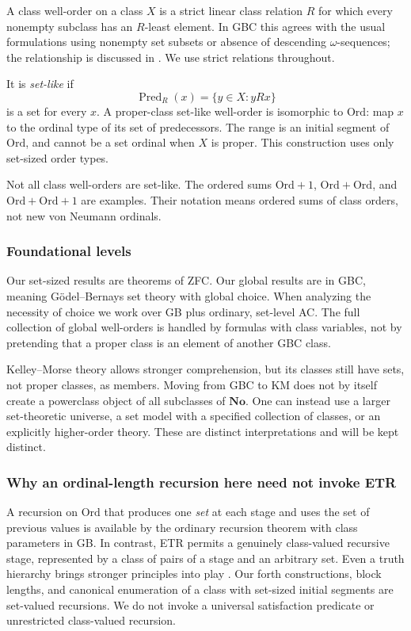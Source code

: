 \documentclass[11pt]{article}
\theoremstyle{definition}
\theoremstyle{remark}
\newcommand{\No}{\mathbf{No}}
\newcommand{\Ord}{\mathrm{Ord}}
\newcommand{\pred}{\operatorname{Pred}}
\begin{document}
A class well-order on a class $X$ is a strict linear class relation $R$
for which every nonempty subclass has an $R$-least element. In GBC this
agrees with the usual formulations using nonempty set subsets or absence
of descending $\omega$-sequences; the relationship is discussed in
\cite[\S3]{HamkinsWoodin}. We use strict relations throughout.

It is \emph{set-like} if
\[
 \pred_R(x)=\{y\in X:yRx\}
\]
is a set for every $x$. A proper-class set-like well-order is isomorphic
to $\Ord$: map $x$ to the ordinal type of its set of predecessors. The
range is an initial segment of $\Ord$, and cannot be a set ordinal when
$X$ is proper. This construction uses only set-sized order types.

Not all class well-orders are set-like. The ordered sums
$\Ord+1$, $\Ord+\Ord$, and $\Ord+\Ord+1$ are examples. Their notation
means ordered sums of class orders, not new von Neumann ordinals.

\subsubsection{Foundational levels}

Our set-sized results are theorems of ZFC. Our global results are in GBC,
meaning Gödel--Bernays set theory with global choice. When analyzing the
necessity of choice we work over GB plus ordinary, set-level AC.
The full collection of global well-orders is handled by formulas with
class variables, not by pretending that a proper class is an element of
another GBC class.

Kelley--Morse theory allows stronger comprehension, but its classes still
have sets, not proper classes, as members. Moving from GBC to KM does not
by itself create a powerclass object of all subclasses of $\No$.
One can instead use a larger set-theoretic universe, a set model with a
specified collection of classes, or an explicitly higher-order theory.
These are distinct interpretations and will be kept distinct.

\subsubsection{Why an ordinal-length recursion here need not invoke ETR}

A recursion on $\Ord$ that produces one \emph{set} at each stage and uses
the set of previous values is available by the ordinary recursion theorem
with class parameters in GB. In contrast, ETR permits a genuinely
class-valued recursive stage, represented by a class of pairs of a stage
and an arbitrary set. Even a truth hierarchy brings stronger principles
into play \cite[\S2]{HamkinsWoodin}. Our forth constructions, block lengths, and
canonical enumeration of a class with set-sized initial segments are
set-valued recursions. We do not invoke a universal satisfaction predicate
or unrestricted class-valued recursion.
\end{document}
